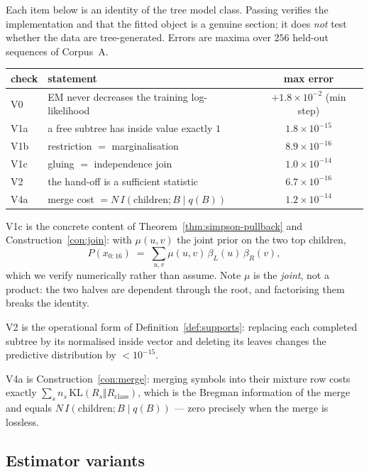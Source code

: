 \documentclass[11pt,a4paper]{article}
\theoremstyle{plain}
\theoremstyle{definition}
\begin{document}
Each item below is an identity of the tree model class. Passing verifies the
implementation and that the fitted object is a genuine section; it does
\emph{not} test whether the data are tree-generated. Errors are maxima over
$256$ held-out sequences of Corpus~A.

\begin{center}
\begin{tabular}{llc}
\toprule
check & statement & max error \\
\midrule
V0 & EM never decreases the training log-likelihood & $+1.8\times10^{-2}$ (min step) \\
V1a & a free subtree has inside value exactly $1$ & $1.8\times10^{-15}$ \\
V1b & restriction $=$ marginalisation & $8.9\times10^{-16}$ \\
V1c & gluing $=$ independence join & $1.0\times10^{-14}$ \\
V2 & the hand-off is a sufficient statistic & $6.7\times10^{-16}$ \\
V4a & merge cost $= N\,I(\text{children};B \mid q(B))$ & $1.2\times10^{-14}$ \\
\bottomrule
\end{tabular}
\end{center}

\noindent
V1c is the concrete content of Theorem~\ref{thm:simpson-pullback} and
Construction~\ref{con:join}: with $\mu(u,v)$ the joint prior on the two top
children,
\begin{equation}
  P(x_{0:16}) \;=\; \sum_{u,v} \mu(u,v)\, \beta_L(u)\, \beta_R(v),
  \label{eq:glue}
\end{equation}
which we verify numerically rather than assume. Note $\mu$ is the \emph{joint},
not a product: the two halves are dependent through the root, and factorising
them breaks the identity.

V2 is the operational form of Definition~\ref{def:supports}: replacing each
completed subtree by its normalised inside vector and deleting its leaves
changes the predictive distribution by $<10^{-15}$.

V4a is Construction~\ref{con:merge}: merging symbols into their mixture row
costs exactly $\sum_s n_s\,\mathrm{KL}(R_s \Vert R_{\mathrm{class}})$, which is
the Bregman information of the merge and equals $N\,I(\text{children};B\mid
q(B))$ --- zero precisely when the merge is lossless.

\subsection{Estimator variants}
\end{document}
